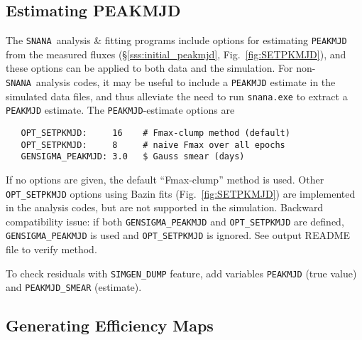 \documentclass[12pt]{article}
\newcommand{\SNANA}{{\tt SNANA}}
\begin{document}
   \subsection{Estimating PEAKMJD}
   \label{subsec:SETPKMJD}

The \SNANA\ analysis \& fitting programs include options for 
estimating {\tt PEAKMJD} from the measured fluxes
(\S\ref{sss:initial_peakmjd}, Fig.~\ref{fig:SETPKMJD}), 
and these options can be applied to both data and the simulation.
For non-\SNANA\ analysis codes, it may be useful to include
a {\tt PEAKMJD} estimate in the simulated data files,
and thus alleviate the need to run {\tt snana.exe} to extract
a {\tt PEAKMJD} estimate. The {\tt PEAKMJD}-estimate options are

\begin{verbatim}
   OPT_SETPKMJD:     16    # Fmax-clump method (default)
   OPT_SETPKMJD:     8     # naive Fmax over all epochs
   GENSIGMA_PEAKMJD: 3.0   $ Gauss smear (days)
\end{verbatim}
%
If no options are given, the default ``Fmax-clump'' method is used.
Other {\tt OPT\_SETPKMJD} options using Bazin fits 
(Fig.~\ref{fig:SETPKMJD})
are implemented in the analysis codes, but are not supported 
in the simulation.
Backward compatibility issue: 
if both {\tt GENSIGMA\_PEAKMJD} and {\tt OPT\_SETPKMJD} are
defined, {\tt GENSIGMA\_PEAKMJD} is used and
{\tt OPT\_SETPKMJD} is ignored. 
See output README file to verify method.

To check residuals with {\tt SIMGEN\_DUMP} feature,
add variables {\tt PEAKMJD} (true value) and {\tt PEAKMJD\_SMEAR}
(estimate).

   \subsection{Generating Efficiency Maps}
   \label{subsec:simeff_genmap}
\end{document}
